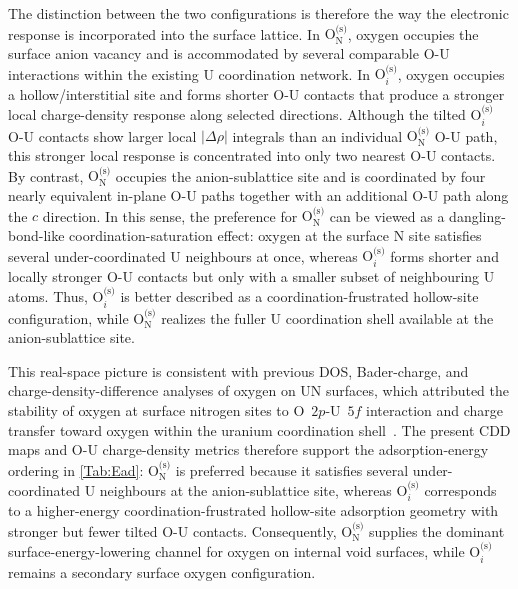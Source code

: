 \documentclass[preprint,12pt,sort&compress]{elsarticle}
\newcommand{\?}{\stackrel{?}{=}}
\begin{document}
The distinction between the two configurations is therefore the way the electronic response is incorporated into the surface lattice. In $\mathrm{O}_{\mathrm{N}}^{\text{(s)}}$, oxygen occupies the surface anion vacancy and is accommodated by several comparable O-U interactions within the existing U coordination network. In $\mathrm{O}_i^{\text{(s)}}$, oxygen occupies a hollow/interstitial site and forms shorter O-U contacts that produce a stronger local charge-density response along selected directions. Although the tilted $\mathrm{O}_i^{\text{(s)}}$ O-U contacts show larger local $|\Delta\rho|$ integrals than an individual $\mathrm{O}_{\mathrm{N}}^{\text{(s)}}$ O-U path, this stronger local response is concentrated into only two nearest O-U contacts. By contrast, $\mathrm{O}_{\mathrm{N}}^{\text{(s)}}$ occupies the anion-sublattice site and is coordinated by four nearly equivalent in-plane O-U paths together with an additional O-U path along the $c$ direction. In this sense, the preference for $\mathrm{O}_{\mathrm{N}}^{\text{(s)}}$ can be viewed as a dangling-bond-like coordination-saturation effect: oxygen at the surface N site satisfies several under-coordinated U neighbours at once, whereas $\mathrm{O}_i^{\text{(s)}}$ forms shorter and locally stronger O-U contacts but only with a smaller subset of neighbouring U atoms. Thus, $\mathrm{O}_i^{\text{(s)}}$ is better described as a coordination-frustrated hollow-site configuration, while $\mathrm{O}_{\mathrm{N}}^{\text{(s)}}$ realizes the fuller U coordination shell available at the anion-sublattice site.

This real-space picture is consistent with previous DOS, Bader-charge, and charge-density-difference analyses of oxygen on UN surfaces, which attributed the stability of oxygen at surface nitrogen sites to O~$2p$-U~$5f$ interaction and charge transfer toward oxygen within the uranium coordination shell~\cite{Bocharov2011JNM,Zhukovskii2009SS,Zhukovskii2009JNM}. The present CDD maps and O-U charge-density metrics therefore support the adsorption-energy ordering in \cref{Tab:Ead}: $\mathrm{O}_{\mathrm{N}}^{\text{(s)}}$ is preferred because it satisfies several under-coordinated U neighbours at the anion-sublattice site, whereas $\mathrm{O}_i^{\text{(s)}}$ corresponds to a higher-energy coordination-frustrated hollow-site adsorption geometry with stronger but fewer tilted O-U contacts. Consequently, $\mathrm{O}_{\mathrm{N}}^{\text{(s)}}$ supplies the dominant surface-energy-lowering channel for oxygen on internal void surfaces, while $\mathrm{O}_i^{\text{(s)}}$ remains a secondary surface oxygen configuration.
\end{document}
